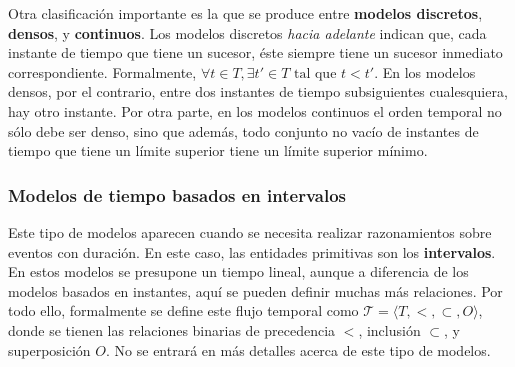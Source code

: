 Otra clasificación importante es la que se produce entre \textbf{modelos discretos}, \textbf{densos}, y \textbf{continuos}. Los modelos discretos \textit{hacia adelante} indican que, cada instante de tiempo que tiene un sucesor, éste siempre tiene un sucesor inmediato correspondiente. Formalmente, $\forall t \in T, \exists t' \in T \text{ tal que } t < t'$. En los modelos densos, por el contrario, entre dos instantes de tiempo subsiguientes cualesquiera, hay otro instante. Por otra parte, en los modelos continuos el orden temporal no sólo debe ser denso, sino que además, todo conjunto no vacío de instantes de tiempo que tiene un límite superior tiene un límite superior mínimo.

\subsubsection{Modelos de tiempo basados en intervalos}\label{subsubsection:TLAtimeinterval}
Este tipo de modelos aparecen cuando se necesita realizar razonamientos sobre eventos con duración. En este caso, las entidades primitivas son los \textbf{intervalos}. En estos modelos se presupone un tiempo lineal, aunque a diferencia de los modelos basados en instantes, aquí se pueden definir muchas más relaciones. Por todo ello, formalmente se define este flujo temporal como $\mathcal{T} = \langle T,<,\subset,O \rangle$, donde se tienen las relaciones binarias de precedencia $<$, inclusión $\subset$, y superposición $O$. No se entrará en más detalles acerca de este tipo de modelos.

